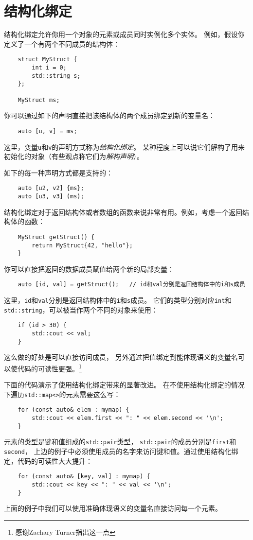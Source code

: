 \section{结构化绑定}\label{ch1}
结构化绑定允许你用一个对象的元素或成员同时实例化多个实体。
例如，假设你定义了一个有两个不同成员的结构体：
\begin{lstlisting}
    struct MyStruct {
        int i = 0;
        std::string s;
    };

    MyStruct ms;
\end{lstlisting}
你可以通过如下的声明直接把该结构体的两个成员绑定到新的变量名：
\begin{lstlisting}
    auto [u, v] = ms;
\end{lstlisting}
这里，变量\texttt{u}和\texttt{v}的声明方式称为\emph{结构化绑定}。
某种程度上可以说它们解构了用来初始化的对象（有些观点称它们为\emph{解构声明}）。

如下的每一种声明方式都是支持的：
\begin{lstlisting}
    auto [u2, v2] {ms};
    auto [u3, v3] (ms);
\end{lstlisting}
结构化绑定对于返回结构体或者数组的函数来说非常有用。例如，考虑一个返回结构体的函数：
\begin{lstlisting}
    MyStruct getStruct() {
        return MyStruct{42, "hello"};
    }
\end{lstlisting}
你可以直接把返回的数据成员赋值给两个新的局部变量：
\begin{lstlisting}
    auto [id, val] = getStruct();   // id和val分别是返回结构体中的i和s成员
\end{lstlisting}
这里，\texttt{id}和\texttt{val}分别是返回结构体中的\texttt{i}和\texttt{s}成员。
它们的类型分别对应\texttt{int}和\texttt{std::string}，可以被当作两个不同的对象来使用：
\begin{lstlisting}
    if (id > 30) {
        std::cout << val;
    }
\end{lstlisting}
这么做的好处是可以直接访问成员，
另外通过把值绑定到能体现语义的变量名可以使代码的可读性更强。\footnote{感谢Zachary Turner指出这一点}

下面的代码演示了使用结构化绑定带来的显著改进。
在不使用结构化绑定的情况下遍历\texttt{std::map<>}的元素需要这么写：
\begin{lstlisting}
    for (const auto& elem : mymap) {
        std::cout << elem.first << ": " << elem.second << '\n';
    }
\end{lstlisting}
元素的类型是键和值组成的\texttt{std::pair}类型，
\texttt{std::pair}的成员分别是\texttt{first}和\texttt{second}，
上边的例子中必须使用成员的名字来访问键和值。通过使用结构化绑定，代码的可读性大大提升：
\begin{lstlisting}
    for (const auto& [key, val] : mymap) {
        std::cout << key << ": " << val << '\n';
    }
\end{lstlisting}
上面的例子中我们可以使用准确体现语义的变量名直接访问每一个元素。

